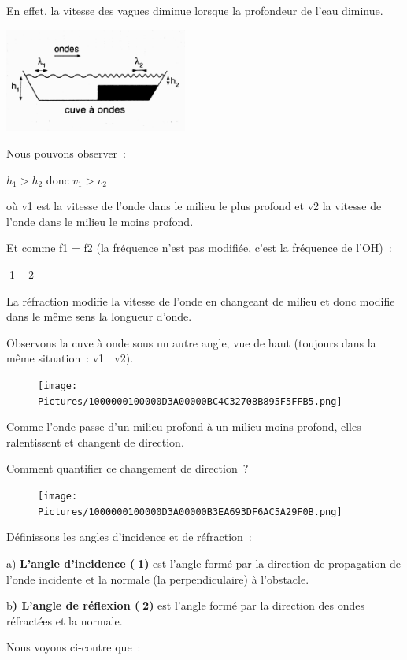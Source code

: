 En effet, la vitesse des vagues diminue lorsque la profondeur de l'eau
diminue.

\includegraphics[width=6.017cm,height=3.408cm]{Pictures/1000000100000A3C000005CCA7E68DBE45CF2A53.png}

Nous pouvons observer~:

$h_1 > h_2$ donc $v_1 > v_2$

où v1 est la vitesse de l'onde dans le milieu le plus profond et v2 la
vitesse de l'onde dans le milieu le moins profond.

Et comme f1 = f2 (la fréquence n'est pas modifiée, c'est la fréquence de
l'OH)~:

1  2

La réfraction modifie la vitesse de l'onde en changeant de milieu et
donc modifie dans le même sens la longueur d'onde.

Observons la cuve à onde sous un autre angle, vue de haut (toujours dans
la même situation~: v1  v2).

\begin{figure}
\centering
\texttt{[image: Pictures/1000000100000D3A00000BC4C32708B895F5FFB5.png]}
\caption{}
\end{figure}

Comme l'onde passe d'un milieu profond à un milieu moins profond, elles
ralentissent et changent de direction.

Comment quantifier ce changement de direction~?

\begin{figure}
\centering
\texttt{[image: Pictures/1000000100000D3A00000B3EA693DF6AC5A29F0B.png]}
\caption{}
\end{figure}

Définissons les angles d'incidence et de réfraction~:

a) \textbf{L'angle d'incidence (1)} est l'angle formé par la direction
de propagation de l'onde incidente et la normale (la perpendiculaire) à
l'obstacle.

b\textbf{) L'angle de réflexion (2)} est l'angle formé par la direction
des ondes réfractées et la normale.

Nous voyons ci-contre que~:

